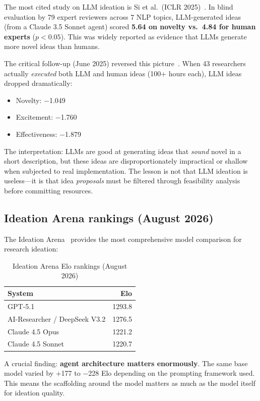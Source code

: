 \documentclass[11pt,a4paper]{article}
\begin{document}
The most cited study on LLM ideation is Si et al.\ (ICLR 2025)~\cite{si2025}. In blind evaluation by 79 expert reviewers across 7 NLP topics, LLM-generated ideas (from a Claude 3.5 Sonnet agent) scored \textbf{5.64 on novelty vs.\ 4.84 for human experts} ($p < 0.05$). This was widely reported as evidence that LLMs generate more novel ideas than humans.

The critical follow-up (June 2025) reversed this picture~\cite{si2025followup}. When 43 researchers actually \emph{executed} both LLM and human ideas (100+ hours each), LLM ideas dropped dramatically:

\begin{itemize}
\item Novelty: $-$1.049
\item Excitement: $-$1.760
\item Effectiveness: $-$1.879
\end{itemize}

The interpretation: LLMs are good at generating ideas that \emph{sound} novel in a short description, but these ideas are disproportionately impractical or shallow when subjected to real implementation. The lesson is not that LLM ideation is useless---it is that idea \emph{proposals} must be filtered through feasibility analysis before committing resources.

\subsection{Ideation Arena rankings (August 2026)}

The Ideation Arena~\cite{ideationarena2026} provides the most comprehensive model comparison for research ideation:

\begin{table}[h]
\centering
\caption{Ideation Arena Elo rankings (August 2026)}
\label{tab:ideation}
\begin{tabular}{lr}
\toprule
\textbf{System} & \textbf{Elo} \\
\midrule
GPT-5.1 & 1293.8 \\
AI-Researcher / DeepSeek V3.2 & 1276.5 \\
Claude 4.5 Opus & 1221.2 \\
Claude 4.5 Sonnet & 1220.7 \\
\bottomrule
\end{tabular}
\end{table}

A crucial finding: \textbf{agent architecture matters enormously}. The same base model varied by +177 to $-$228 Elo depending on the prompting framework used. This means the scaffolding around the model matters as much as the model itself for ideation quality.
\end{document}
